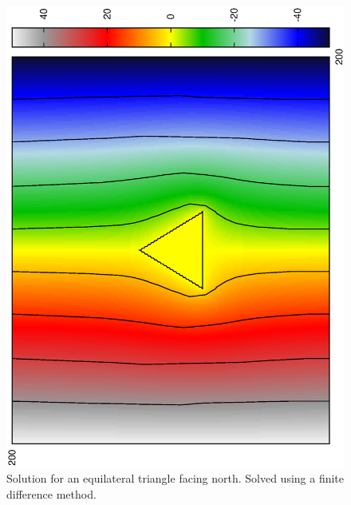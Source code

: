 \documentclass[aps,twocolumn,pre,nofootinbib,10pt]{revtex4-1}
\begin{document}
\begin{figure}[h]
\includegraphics*[height=\breite \columnwidth,angle=270]{triangle.ps} 
\caption{Solution for an equilateral triangle facing north. Solved using a finite difference method.}
\end{figure}
\newpage
\end{document}
